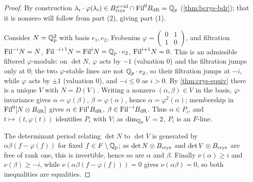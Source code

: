 \begin{proof}
  By construction \(\lambda_i \cdot \varphi(\lambda_i) \in B_{\mathrm{crys}}^{\varphi=\mathrm{id}}
  \cap \mathrm{Fil}^0 B_{\mathrm{dR}} = \mathbb{Q}_p\) (\cref{thm:bcrys-bdr}); that it is nonzero will
  follow from part (2), giving part (1).

  Consider \(N = \mathbb{Q}_p^2\) with basis \(e_1, e_2\), Frobenius
  \(\varphi = \left(\begin{smallmatrix} 0 & 1 \\ 1 & 0 \end{smallmatrix}\right)\),
  and filtration \(\mathrm{Fil}^{-i} N = N\),
  \(\mathrm{Fil}^{-i+1} N = \mathrm{Fil}^i N = \mathbb{Q}_p \cdot e_2\), \(\mathrm{Fil}^{i+1} N = 0\). This is an
  admissible filtered \(\varphi\)-module: on \(\det N\), \(\varphi\) acts by
  \(-1\) (valuation \(0\)) and the filtration jumps only at \(0\); the two
  \(\varphi\)-stable lines are not \(\mathbb{Q}_p \cdot e_2\), so their filtration jumps
  at \(-i\), while \(\varphi\) acts by \(\pm 1\) (valuation \(0\)), and
  \(-i \leq 0\) as \(i > 0\). By \cref{thm:crys-equiv} there is a unique \(V\)
  with \(N = D(V)\). Writing a nonzero \((\alpha, \beta) \in V\) in the basis,
  \(\varphi\)-invariance gives \(\alpha = \varphi(\beta)\),
  \(\beta = \varphi(\alpha)\), hence \(\alpha = \varphi^2(\alpha)\); membership
  in \(\mathrm{Fil}^0[N \otimes B_{\mathrm{dR}}]\) gives \(\alpha \in \mathrm{Fil}^i B_{\mathrm{dR}}\),
  \(\beta \in \mathrm{Fil}^{-i} B_{\mathrm{dR}}\). Thus \(\alpha \in P_i\), and \(t \mapsto (t,
  \varphi(t))\) identifies \(P_i\) with \(V\); as \(\dim_{\mathbb{Q}_p} V = 2\), \(P_i\)
  is an \(F\)-line.

  The determinant period relating \(\det N\) to \(\det V\) is generated by
  \(\alpha\beta(f - \varphi(f))\) for fixed \(f \in F \setminus \mathbb{Q}_p\); as
  \(\det N \otimes B_{\mathrm{crys}}\) and \(\det V \otimes B_{\mathrm{crys}}\) are free of rank one,
  this is invertible, hence so are \(\alpha\) and \(\beta\). Finally
  \(\nu(\alpha) \geq i\) and \(\nu(\beta) \geq -i\), while
  \(\nu(\alpha\beta(f - \varphi(f))) = 0\) gives \(\nu(\alpha\beta) = 0\), so
  both inequalities are equalities.
\end{proof}

